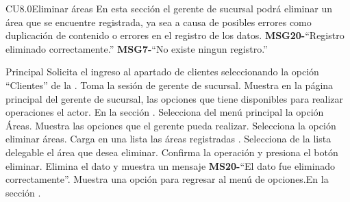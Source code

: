 

	\begin{UseCase}{CU8.0}{Eliminar áreas}{
		En esta sección el gerente de sucursal podrá eliminar un área que se encuentre registrada, ya sea a causa de posibles errores como duplicación de contenido o errores en el registro de los datos.
	}
		{
		{\bf MSG20-}``Registro eliminado correctamente.''		
		{\bf MSG7-}``No existe ningun registro.'' }

	\end{UseCase}

\begin{UCtrayectoria}{Principal}
		\UCpaso[\UCactor] Solicita el ingreso al apartado de clientes seleccionando la opción ``Clientes'' de la .
		\UCpaso Toma la sesión de gerente de sucursal.
		\UCpaso Muestra en la página principal del gerente de sucursal, las opciones que tiene disponibles para realizar operaciones el actor. En la sección .
		\UCpaso[\UCactor] Selecciona del menú principal la opción Áreas.
		\UCpaso Muestra las opciones que el gerente pueda realizar. 
		\UCpaso[\UCactor] Selecciona la opción eliminar áreas.
		\UCpaso Carga en una lista las áreas registradas .
		\UCpaso[\UCactor] Selecciona de la lista delegable el área que desea eliminar. 
		\UCpaso[\UCactor] Confirma la operación y presiona el botón eliminar.
		\UCpaso Elimina el dato y muestra un mensaje {\bf MS20-}``El dato fue eliminado correctamente''.
		\UCpaso Muestra una opción para regresar al menú de opciones.En la sección . 
	\end{UCtrayectoria}

